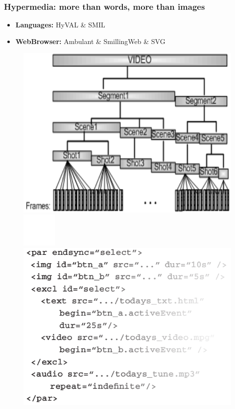 \documentclass[compress]{beamer}
\begin{document}
\begin{frame}[c]
\begin{figure}
		\end{figure}
		\end{frame}


		\begin{frame}[c]
		\frametitle{Hypermedia: more than words, more than images}
		\begin{itemize}		
		\item \textbf{Languages:} HyVAL \& SMIL
		\vfill
		\item \textbf{WebBrowser:} Ambulant \& SmillingWeb \& SVG
		\end{itemize}
		
			\begin{figure}
			\includegraphics[height=0.4\textheight]{figures/hyval.png}
			\includegraphics[height=0.1\textheight]{figures/space.png}
			\includegraphics[height=0.4\textheight]{figures/smil.png}
		\end{figure}
		\end{frame}
\end{document}
